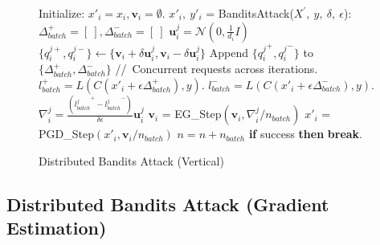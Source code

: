 \begin{figure}[tbp]
\begin{minipage}{\textwidth}
\begin{algorithm}[H]
    \centering
    \caption{Distributed Bandits Attack (Vertical)}
    \label{alg:bandits_vertical}
    \begin{algorithmic}[1]
            \State Initialize: $x'_i = x_i, \boldsymbol{v}_i =\emptyset$.
            \State $x'_i,\ y'_{i}$ = BanditsAttack($X^{'},\ y,\ \delta,\ \epsilon$):
            \Indent
                \For {each iteration $n \in [0,\ n_{iter})$}
                    \State $\Delta^+_{batch} = [\ ], \Delta^-_{batch} = [\ ]$
                            \State $\boldsymbol{u}_i^j = \mathcal{N}(0, \frac{1}{d_i}I)$
                            \State $\{q_{i}^{j+}, q_{i}^{j-}\} \leftarrow \{\boldsymbol{v}_i + \delta \boldsymbol{u}_i^j, {\boldsymbol{v}_i - \delta \boldsymbol{u}_i^j}\}$
                            \State Append $\{{q_{i}^{j}}^+, {q_{i}^{j}}^-\}$ to $\{\Delta_{batch}^+, \Delta_{batch}^-\}$ 
                    \EndFor
                    \State //\ Concurrent requests across iterations.
                    \State $l^+_{batch} = L(C(x{'}_i + \epsilon\Delta_{batch}^+), y)$.
                    \State $l^-_{batch} = L(C(x{'}_i + \epsilon\Delta_{batch}^-), y)$.
                        \State $\nabla_i^j = \frac{({l^j_{batch}}^+ - {l^j_{batch}}^-)}{\delta\epsilon} \boldsymbol{u}_i^j$
                        \State $\boldsymbol{v}_i$ = EG\_Step$(\boldsymbol{v}_i, \nabla_i^j / n_{batch})$
                        \State $x'_i$ = PGD\_Step$(x'_i, \boldsymbol{v}_i / n_{batch})$
                    \EndFor
                    \State $n = n + n_{batch}$
                    \State \textbf{if} {success} \textbf{then} {\textbf{break}}.
                \EndFor
            \EndIndent
        \EndFor
    \end{algorithmic}
\end{algorithm}
\end{minipage}
\end{figure}

\subsection{Distributed Bandits Attack (Gradient Estimation)}


